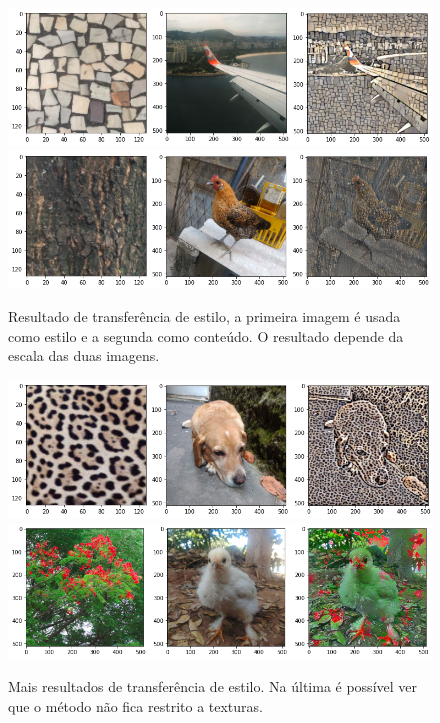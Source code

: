 \begin{figure}[!ht]
	\centering
	\includegraphics[width=\linewidth]{files/assets/results/air1.png}
	\includegraphics[width=\linewidth]{files/assets/results/galinha1.png}
	\caption{Resultado de transferência de estilo, a primeira imagem
	é usada como estilo e a segunda como conteúdo. O resultado
	depende da escala das duas imagens.}
	\label{img:preview}
\end{figure}
\begin{figure}[!ht]
	\centering
	\includegraphics[width=\linewidth]{files/assets/results/magali.png}
	\includegraphics[width=\linewidth]{files/assets/results/galinha2.png}
	\caption{Mais resultados de transferência de estilo. Na última é
	possível ver que o método não fica restrito a texturas.}
	\label{img:preview}
\end{figure}




